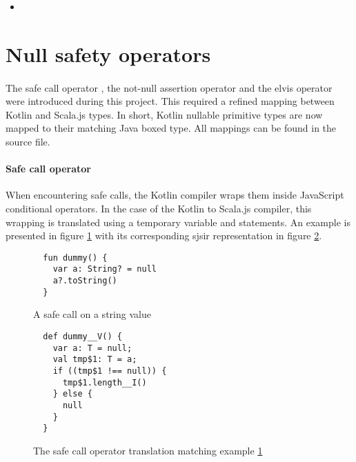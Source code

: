 \begin{itemize}
 \item {}
\end{itemize}

\section{Null safety operators} \label{null_safety}

\paragraph{} The safe call operator , the not-null assertion operator \ktinline{!!} 
and the elvis operator  were introduced during this project. This required a refined 
mapping between Kotlin and Scala.js types. In short, Kotlin nullable primitive types are now mapped to 
their matching Java boxed type. All mappings can be found in the  
source file.

\paragraph{Safe call operator } When encountering safe calls, the Kotlin compiler wraps them inside JavaScript conditional operators. In the case of the Kotlin to Scala.js compiler, this wrapping is translated using a temporary variable and  statements. An example is presented in figure \ref{safe_call_example} with its corresponding sjsir representation in figure \ref{safe_call_example_ir}.

\begin{figure}[h]
  \begin{verbatim}
  fun dummy() {
    var a: String? = null
    a?.toString()
  }
  \end{verbatim}
  \caption{A safe call on a string value}
  \label{safe_call_example}
\end{figure}

\begin{figure}[h]
  \begin{verbatim}
  def dummy__V() {
    var a: T = null;
    val tmp$1: T = a;
    if ((tmp$1 !== null)) {
      tmp$1.length__I()
    } else {
      null
    }
  }
  \end{verbatim}
  \caption{The safe call operator translation matching example \ref{safe_call_example}}
  \label{safe_call_example_ir}
\end{figure}

